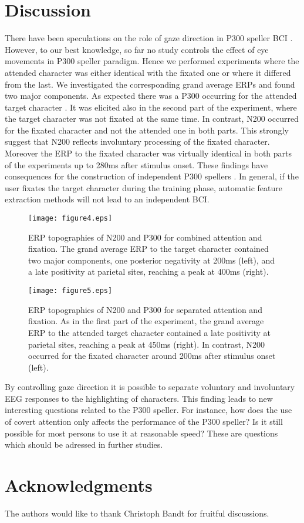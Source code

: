 \documentclass[a4paper,twocolumn]{article}
\begin{document}
\section*{Discussion}
There have been speculations on the role of gaze direction in P300 speller BCI \cite{BlankertzCurio2003,Kaper2004,Krusienski2008,Hoffmann2008}. However, to our best knowledge, so far no study controls the effect of eye movements in P300 speller paradigm. Hence we performed experiments where the attended character was either identical with the fixated one or where it differed from the last. We investigated the corresponding grand average ERPs and found two major components. As expected there was a P300 occurring for the attended target character \cite{Sutton1965,Farwell1988}. It was elicited also in the second part of the experiment, where the target character was not fixated at the same time. In contrast, N200 occurred for the fixated character and not the attended one in both parts. This strongly suggest that N200 reflects involuntary processing of the fixated character. Moreover the ERP to the fixated character was virtually identical in both parts of the experiments up to 280ms after stimulus onset. These findings have consequences for the construction of independent P300 spellers \cite{Wolpaw2002}. In general, if the user fixates the target character during the training phase, automatic feature extraction methods will not lead to an independent BCI.
\begin{figure}
\begin{center}
\texttt{[image: figure4.eps]}
\end{center}
\caption{{ERP topographies of N200 and P300 for combined attention and fixation.} The grand average ERP to the target character contained two major components, one posterior negativity at 200ms (left), and a late positivity at parietal sites, reaching a peak at 400ms (right).}
\label{fig:topopgraphic_maps_EE}
\end{figure}

\begin{figure}
\begin{center}
\texttt{[image: figure5.eps]}
\end{center}
\caption{{ERP topographies of N200 and P300 for separated attention and fixation.} As in the first part of the experiment, the grand average ERP to the attended target character contained a late positivity at parietal sites, reaching a peak at 450ms (right). In contrast, N200 occurred for the fixated character around 200ms after stimulus onset (left).}
\label{fig:topopgraphic_maps_EB}
\end{figure}
By controlling gaze direction it is possible to separate voluntary and involuntary EEG responses to the highlighting of characters. This finding leads to new interesting questions related to the P300 speller. For instance, how does the use of covert attention only affects the performance of the P300 speller? Is it still possible for most persons to use it at reasonable speed? These are questions which should be adressed in further studies.
\section*{Acknowledgments}
The authors would like to thank Christoph Bandt for fruitful discussions.


\end{document}
